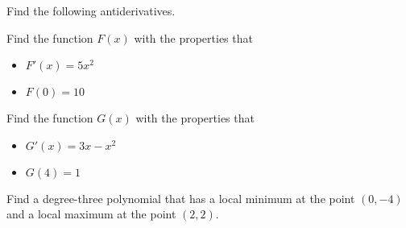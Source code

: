 
Find the following antiderivatives.

\begin{multicols}{2}
 \begin{ProblemSet}[pencil space=3.75in]
 \end{ProblemSet}
\end{multicols}

\begin{ProblemSet}[pencil space=2in]
 \begin{Problem}
  Find the function $F(x)$ with the properties that
  \begin{itemize}
  \item $F'(x) = 5 x^2$
  \item $F(0) = 10$
  \end{itemize}
 \end{Problem}
 \begin{Problem}
  Find the function $G(x)$ with the properties that
  \begin{itemize}
  \item $G'(x) = 3 x - x^2$
  \item $G(4) = 1$
  \end{itemize}
 \end{Problem}
 \begin{Problem}
  Find a degree-three polynomial that has a local minimum at the point $(0, -4)$ and a local maximum at the point $(2, 2)$.
 \end{Problem}
\end{ProblemSet}

